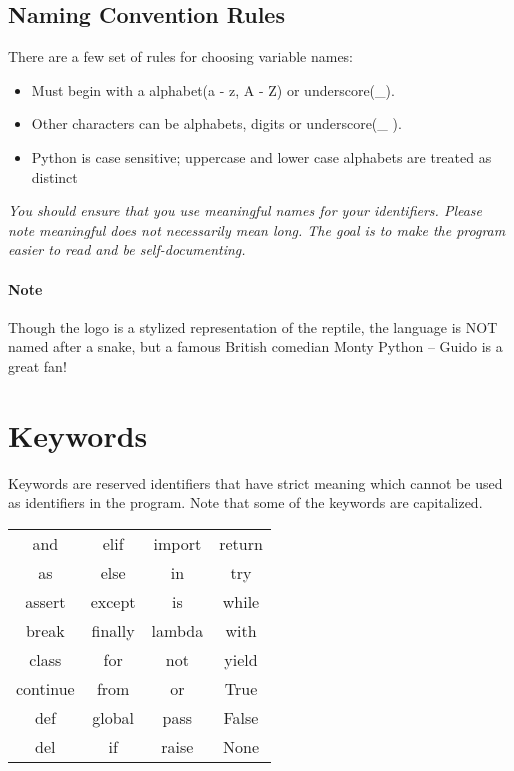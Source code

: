 \documentclass[]{book}
\begin{document}
    \subsection*{Naming Convention Rules}
    There are a few set of rules for choosing variable names:
    \begin{itemize}
        \item Must begin with a alphabet(a - z, A - Z) or underscore(\_).
        \item Other characters can be alphabets, digits or underscore(\_ ).
        \item Python is case sensitive; uppercase and lower case alphabets are treated as distinct
    \end{itemize}
    \emph{You should ensure that you use meaningful names for your identifiers. Please note meaningful does not necessarily mean long. The goal is to make the program easier to read and be self-documenting.}
    \paragraph{Note} Though the logo is a stylized representation of the reptile, the language is NOT named after a snake, but a famous British comedian Monty Python – Guido is a great fan!
 \section*{Keywords}
    Keywords are reserved identifiers that have strict meaning which cannot be used as identifiers in the program. Note that some of the keywords are capitalized.

    \begin{center}
        \begin{tabular}{c c c c}
            
            and & elif & import & return\\ 
            as & else & in & try \\
            assert & except & is & while \\
            break & finally & lambda & with \\
            class & for & not & yield \\
            continue & from & or & True\\
            def & global & pass & False \\
            del & if & raise & None
            \end{tabular}
        
    \end{center}
\end{document}

